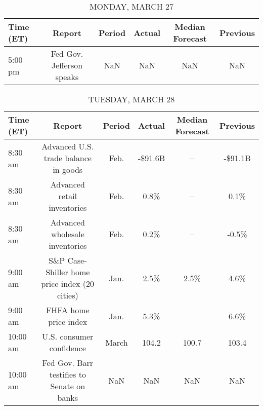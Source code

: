 \documentclass{article}%
\begin{document}
%
\normalsize%


\begin{table}[htbp]%
\caption{MONDAY, MARCH 27}%
\centering%
\begin{adjustbox}{width=1\textwidth}%
\begin{tabular}{lccccc}
\toprule
Time (ET) &                    Report & Period & Actual & Median Forecast & Previous \\
\midrule
  5:00 pm & Fed Gov. Jefferson speaks &    NaN &    NaN &             NaN &      NaN \\
\bottomrule
\end{tabular}
%
\end{adjustbox}%
\end{table}

%


\begin{table}[htbp]%
\caption{TUESDAY, MARCH 28}%
\centering%
\begin{adjustbox}{width=1\textwidth}%
\begin{tabular}{lccccc}
\toprule
Time (ET) &                                        Report & Period &  Actual & Median Forecast & Previous \\
\midrule
  8:30 am &          Advanced U.S. trade balance in goods &   Feb. & -\$91.6B &              -- &  -\$91.1B \\
  8:30 am &                   Advanced retail inventories &   Feb. &    0.8\% &              -- &     0.1\% \\
  8:30 am &                Advanced wholesale inventories &   Feb. &    0.2\% &              -- &    -0.5\% \\
  9:00 am & S\&P Case-Shiller home price index (20 cities) &   Jan. &    2.5\% &            2.5\% &     4.6\% \\
  9:00 am &                         FHFA home price index &   Jan. &    5.3\% &              -- &     6.6\% \\
 10:00 am &                      U.S. consumer confidence &  March &   104.2 &           100.7 &    103.4 \\
 10:00 am &    Fed Gov. Barr testifies to Senate on banks &    NaN &     NaN &             NaN &      NaN \\
\bottomrule
\end{tabular}
%
\end{adjustbox}%
\end{table}

%
\end{document}
